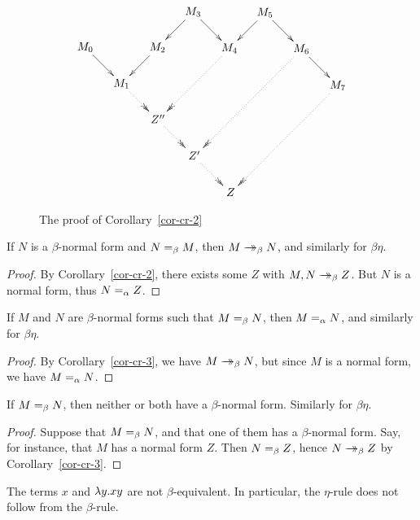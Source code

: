\documentclass{article}
\begin{document}
\begin{figure}
\vspace{-6em}
\[ \xymatrix@dr{
  && M_5\ar@{->}[r]\ar@{->}[d]
  & M_6\ar@{->}[r]\ar@{.>>}[ddd]
  & M_7\ar@{.>>}[ddd]
  \\& M_3\ar@{->}[r]\ar@{->}[d]
  & M_4\ar@{.>>}[dd]
  \\& M_2\ar@{->}[d]
  \\ M_0\ar@{->}[r]
  & M_1\ar@{.>>}[r]
  & Z''\ar@{.>>}[r]
  & Z'\ar@{.>>}[r]
  & Z
  }
\]
\caption{The proof of Corollary~\ref{cor-cr-2}}
\label{fig-cor-cr-2}
\end{figure}

\begin{corollary}\label{cor-cr-3}
  If $N$ is a $\beta$-normal form and $N=_{\beta} M$, then $M\mathrel{\rightarrow\!\!\!\!\!\rightarrow}_{\beta} N$, and
  similarly for $\beta\eta$.
\end{corollary}

\begin{proof}
  By Corollary~\ref{cor-cr-2}, there exists some $Z$ with $M,N\mathrel{\rightarrow\!\!\!\!\!\rightarrow}_{\beta}
  Z$. But $N$ is a normal form, thus $N=_{\alpha} Z$. \eot
\end{proof}

\begin{corollary}\label{cor-cr-4}
  If $M$ and $N$ are $\beta$-normal forms such that $M=_{\beta} N$, then
  $M=_{\alpha} N$, and similarly for $\beta\eta$.
\end{corollary}

\begin{proof}
  By Corollary~\ref{cor-cr-3}, we have $M\mathrel{\rightarrow\!\!\!\!\!\rightarrow}_{\beta} N$, but since $M$ is a
  normal form, we have $M=_{\alpha} N$. \eot
\end{proof}

\begin{corollary}
  If $M=_{\beta} N$, then neither or both have a $\beta$-normal
  form. Similarly for $\beta\eta$.
\end{corollary}

\begin{proof}
  Suppose that $M=_{\beta} N$, and that one of them has a $\beta$-normal
  form. Say, for instance, that $M$ has a normal form $Z$. Then $N=_{\beta}
  Z$, hence $N\mathrel{\rightarrow\!\!\!\!\!\rightarrow}_{\beta} Z$ by Corollary~\ref{cor-cr-3}. \eot
\end{proof}

\begin{corollary}\label{cor-beta-not-eta}
  The terms $x$ and $\lambda y.xy$ are not $\beta$-equivalent. In
  particular, the $\eta$-rule does not follow from the $\beta$-rule.
\end{corollary}
\end{document}
